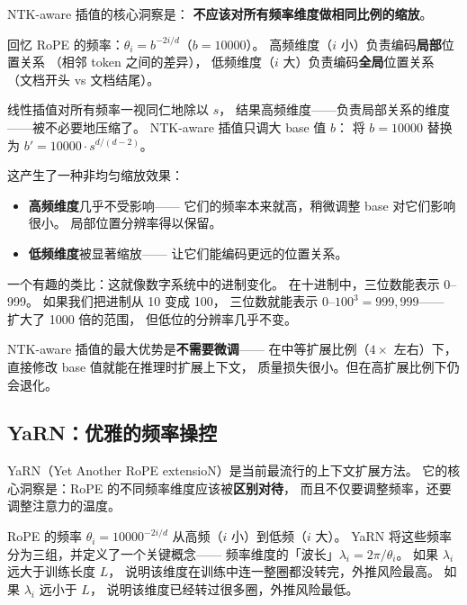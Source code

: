 NTK-aware 插值的核心洞察是：
\textbf{不应该对所有频率维度做相同比例的缩放}。

回忆 RoPE 的频率：$\theta_i = b^{-2i/d}$（$b = 10000$）。
高频维度（$i$ 小）负责编码\textbf{局部}位置关系
（相邻 token 之间的差异），
低频维度（$i$ 大）负责编码\textbf{全局}位置关系
（文档开头 vs 文档结尾）。

线性插值对所有频率一视同仁地除以 $s$，
结果高频维度——负责局部关系的维度——被不必要地压缩了。
NTK-aware 插值只调大 base 值 $b$：
将 $b = 10000$ 替换为 $b' = 10000 \cdot s^{d/(d-2)}$。

这产生了一种非均匀缩放效果：
\begin{itemize}[noitemsep]
  \item \textbf{高频维度}几乎不受影响——
        它们的频率本来就高，稍微调整 base 对它们影响很小。
        局部位置分辨率得以保留。
  \item \textbf{低频维度}被显著缩放——
        让它们能编码更远的位置关系。
\end{itemize}

一个有趣的类比：这就像数字系统中的进制变化。
在十进制中，三位数能表示 0--999。
如果我们把进制从 10 变成 100，
三位数就能表示 0--$100^3 = 999{,}999$——
扩大了 1000 倍的范围，
但低位的分辨率几乎不变。

NTK-aware 插值的最大优势是\textbf{不需要微调}——
在中等扩展比例（$4\times$ 左右）下，
直接修改 base 值就能在推理时扩展上下文，
质量损失很小。但在高扩展比例下仍会退化。

\subsection{YaRN：优雅的频率操控}

YaRN（Yet Another RoPE extensioN）是当前最流行的上下文扩展方法。
它的核心洞察是：RoPE 的不同频率维度应该被\textbf{区别对待}，
而且不仅要调整频率，还要调整注意力的温度。


RoPE 的频率 $\theta_i = 10000^{-2i/d}$ 从高频（$i$ 小）到低频（$i$ 大）。
YaRN 将这些频率分为三组，并定义了一个关键概念——
频率维度的「波长」$\lambda_i = 2\pi / \theta_i$。
如果 $\lambda_i$ 远大于训练长度 $L$，
说明该维度在训练中连一整圈都没转完，外推风险最高。
如果 $\lambda_i$ 远小于 $L$，
说明该维度已经转过很多圈，外推风险最低。

